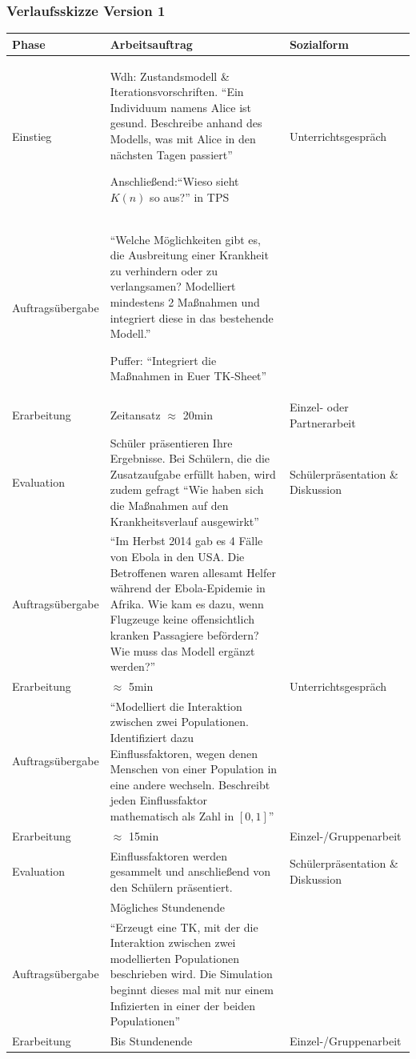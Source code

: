 \begin{landscape}
\subsubsection*{Verlaufsskizze Version 1}
\noindent
\begin{longtable}{|C{0.3\textwidth}|L{0.8\textwidth}|L{0.4\textwidth}|}
\hline
Phase & Arbeitsauftrag & Sozialform\\
\hline\hline
\endhead
\hline
\endfoot
Einstieg& Wdh: Zustandsmodell \& Iterationsvorschriften. ``Ein Individuum namens Alice ist gesund. Beschreibe anhand des Modells, was mit Alice in den nächsten Tagen passiert''

Anschließend:``Wieso sieht $K(n)$ so aus?'' in TPS& Unterrichtsgespräch\\\hline
Auftragsübergabe&``Welche Möglichkeiten gibt es, die Ausbreitung einer Krankheit zu verhindern oder zu verlangsamen? Modelliert mindestens 2 Maßnahmen und integriert diese in das bestehende Modell.''

Puffer: ``Integriert die Maßnahmen in Euer TK-Sheet''&\\\hline
Erarbeitung&Zeitansatz $\approx$ 20min&Einzel- oder Partnerarbeit\\\hline
Evaluation&Schüler präsentieren Ihre Ergebnisse. Bei Schülern, die die Zusatzaufgabe erfüllt haben, wird zudem gefragt ``Wie haben sich die Maßnahmen auf den Krankheitsverlauf ausgewirkt''&Schülerpräsentation \& Diskussion\\\hline
Auftragsübergabe&``Im Herbst 2014 gab es 4 Fälle von Ebola in den USA. Die Betroffenen waren allesamt Helfer während der Ebola-Epidemie in Afrika. Wie kam es dazu, wenn Flugzeuge keine offensichtlich kranken Passagiere befördern? Wie muss das Modell ergänzt werden?''&\\\hline
Erarbeitung&$\approx$ 5min&Unterrichtsgespräch\\\hline
Auftragsübergabe&``Modelliert die Interaktion zwischen zwei Populationen. Identifiziert dazu Einflussfaktoren, wegen denen Menschen von einer Population in eine andere wechseln. Beschreibt jeden Einflussfaktor mathematisch als Zahl in $[0,1]$''&\\\hline
Erarbeitung&$\approx$ 15min&Einzel-/Gruppenarbeit\\\hline
Evaluation&Einflussfaktoren werden gesammelt und anschließend von den Schülern präsentiert.&Schülerpräsentation \& Diskussion\\\hline\hline
&Mögliches Stundenende&\\\hline\hline
Auftragsübergabe&``Erzeugt eine TK, mit der die Interaktion zwischen zwei modellierten Populationen beschrieben wird. Die Simulation beginnt dieses mal mit nur einem Infizierten in einer der beiden Populationen''&\\\hline
Erarbeitung&Bis Stundenende&Einzel-/Gruppenarbeit\\
\end{longtable}

\end{landscape}
